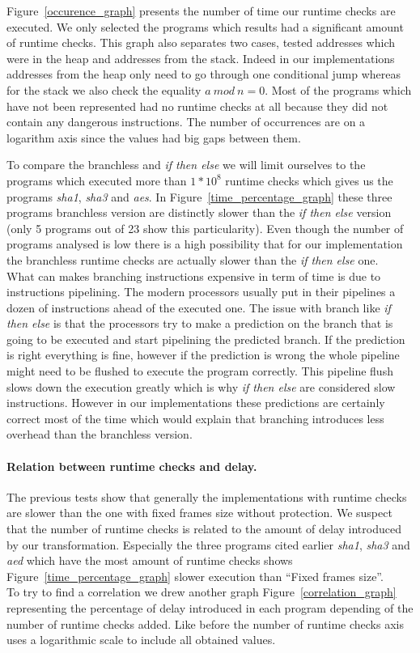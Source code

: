 \documentclass[11pt]{sdm}
\begin{document}
Figure~\ref{occurence_graph} presents the number of time our runtime checks are executed. We only selected the programs which results had a significant amount of runtime checks. This graph also separates two cases, tested addresses which were in the heap and addresses from the stack. Indeed in our implementations addresses from the heap only need to go through one conditional jump whereas for the stack we also check the equality $a~mod~n=0$.
Most of the programs which have not been represented had no runtime checks at all because they did not contain any dangerous instructions.
The number of occurrences are on a logarithm axis since the values had big gaps between them.

To compare the branchless and \textit{if then else} we will limit ourselves to the programs which executed more than $1*10^8$ runtime checks which gives us the programs \textit{sha1}, \textit{sha3} and \textit{aes}. In Figure~\ref{time_percentage_graph} these three programs branchless version are distinctly slower than the \textit{if then else} version (only 5 programs out of 23 show this particularity). Even though the number of programs analysed is low there is a high possibility that for our implementation the branchless runtime checks are actually slower than the \textit{if then else} one.\\
What can makes branching instructions expensive in term of time is due to instructions pipelining. 
The modern processors usually put in their pipelines a dozen of instructions ahead of the executed one. 
The issue with branch like \textit{if then else} is that the processors try to make a prediction on the branch that is going to be executed and start pipelining the predicted branch.
If the prediction is right everything is fine, however if the prediction is wrong the whole pipeline might need to be flushed to execute the program correctly. This pipeline flush slows down the execution greatly which is why \textit{if then else} are considered slow instructions.
However in our implementations these predictions are certainly correct most of the time which would explain that branching introduces less overhead than the branchless version.

\paragraph{Relation between runtime checks and delay.}

The previous tests show that generally the implementations with runtime checks are slower than the one with fixed frames size without protection. We suspect that the number of runtime checks is related to the amount of delay introduced by our transformation. 
Especially the three programs cited earlier \textit{sha1}, \textit{sha3} and \textit{aed} which have the most amount of runtime checks shows Figure~\ref{time_percentage_graph} slower execution than ``Fixed frames size''. \\
To try to find a correlation we drew another graph Figure~\ref{correlation_graph} representing the percentage of delay introduced in each program depending of the number of runtime checks added. Like before the number of runtime checks axis uses a logarithmic scale to include all obtained values.
\end{document}
